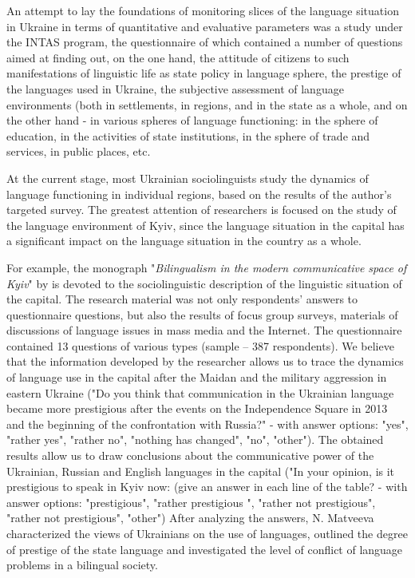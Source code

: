 \documentclass[english]{textolivre}
\begin{document}
An attempt to lay the foundations of monitoring slices of the language situation in Ukraine in terms of quantitative and evaluative parameters was a study under the INTAS program, the questionnaire of which contained a number of questions aimed at finding out, on the one hand, the attitude of citizens to such manifestations of linguistic life as state policy in language sphere, the prestige of the languages used in Ukraine, the subjective assessment of language environments (both in settlements, in regions, and in the state as a whole, and on the other hand - in various spheres of language functioning: in the sphere of education, in the activities of state institutions, in the sphere of trade and services, in public places, etc.

At the current stage, most Ukrainian sociolinguists study the dynamics of language functioning in individual regions, based on the results of the author's targeted survey. The greatest attention of researchers is focused on the study of the language environment of Kyiv, since the language situation in the capital has a significant impact on the language situation in the country as a whole.

For example, the monograph "\emph{Bilingualism in the modern communicative space of Kyiv}" by \textcite{matveieva2020} is devoted to the sociolinguistic description of the linguistic situation of the capital. The research material was not only respondents' answers to questionnaire questions, but also the results of focus group surveys, materials of discussions of language issues in mass media and the Internet. The questionnaire contained 13 questions of various types (sample – 387 respondents). We believe that the information developed by the researcher allows us to trace the dynamics of language use in the capital after the Maidan and the military aggression in eastern Ukraine ("Do you think that communication in the Ukrainian language became more prestigious after the events on the Independence Square in 2013 and the beginning of the confrontation with Russia?" - with answer options: "yes", "rather yes", "rather no", "nothing has changed", "no", "other"). The obtained results allow us to draw conclusions about the communicative power of the Ukrainian, Russian and English languages in the capital ("In your opinion, is it prestigious to speak in Kyiv now: (give an answer in each line of the table? - with answer options: "prestigious", "rather prestigious ", "rather not prestigious", "rather not prestigious", "other") After analyzing the answers, N. Matveeva characterized the views of Ukrainians on the use of languages, outlined the degree of prestige of the state language and investigated the level of conflict of language problems in a bilingual society.
\end{document}

